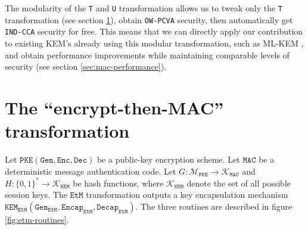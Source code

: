 \documentclass[floatrow,journal=tches,submission]{iacrtrans}
\newcommand{\pke}{\texttt{PKE}}
\newcommand{\keygen}{\texttt{Gen}}
\newcommand{\encrypt}{\texttt{Enc}}
\newcommand{\decrypt}{\texttt{Dec}}
\newcommand{\kem}{\texttt{KEM}}
\newcommand{\encap}{\texttt{Encap}}
\newcommand{\decap}{\texttt{Decap}}
\newcommand{\etm}{\texttt{EtM}}  %
\newcommand{\mac}{\texttt{MAC}}
\begin{document}
The modularity of the \texttt{T} and \texttt{U} transformation allows us to tweak only the \texttt{T} transformation (see section \ref{sec:main-results}), obtain \texttt{OW-PCVA} security, then automatically get \texttt{IND-CCA} security for free. This means that we can directly apply our contribution to existing KEM's already using this modular transformation, such as ML-KEM \cite{key2023mechanism}, and obtain performance improvements while maintaining comparable levels of security (see section \ref{sec:mac-performance}).

\section{The ``encrypt-then-MAC'' transformation}\label{sec:main-results}
Let $\pke(\keygen, \encrypt, \decrypt)$ be a public-key encryption scheme. Let $\mac$ be a deterministic message authentication code. Let $G: \mathcal{M}_\pke \rightarrow \mathcal{K}_\mac$ and $H: \{0,1\}^\ast \rightarrow \mathcal{K}_\kem$ be hash functions, where $\mathcal{K}_\kem$ denote the set of all possible session keys. The $\etm$ transformation outputs a key encapsulation mechanism $\kem_\etm(\keygen_\etm, \encap_\etm, \decap_\etm)$. The three routines are described in figure \ref{fig:etm-routines}.
\end{document}
